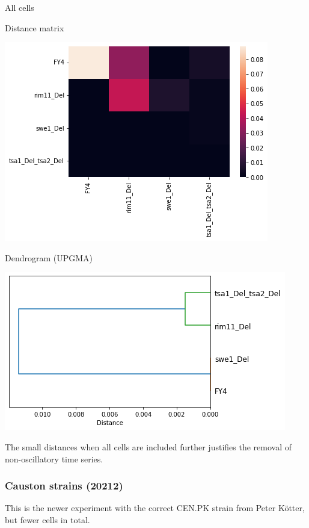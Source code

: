 All cells
\label{sec:org0854ace}

Distance matrix

\begin{center}
\includegraphics[width=.9\linewidth]{MIHierClust_19979_all_distmatrix.png}
\end{center}

Dendrogram (UPGMA)

\begin{center}
\includegraphics[width=.9\linewidth]{MIHierClust_19979_all_dendrogram.png}
\end{center}

The small distances when all cells are included further justifies the removal of non-oscillatory time series.

\subsubsection{Causton strains (20212)}
\label{sec:orgcc0d5be}

This is the newer experiment with the correct CEN.PK strain from Peter Kötter, but fewer cells in total.

